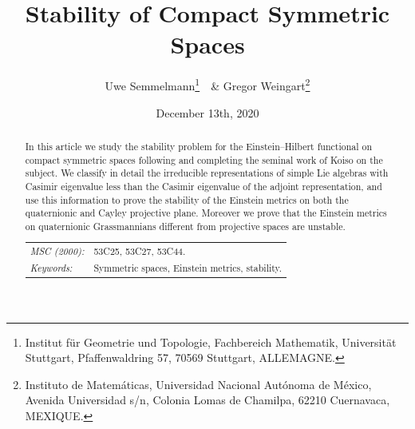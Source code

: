 \documentclass[12pt]{article}
\date{December 13th, 2020}
\title{Stability of Compact Symmetric Spaces}
\author{Uwe Semmelmann\footnote{Institut f\"ur Geometrie und Topologie,
 Fachbereich Mathematik, Universit\"at Stuttgart, Pfaffenwaldring 57,
 70569 Stuttgart, ALLEMAGNE.}\ \ 
 \& Gregor Weingart\footnote{Instituto de Matem\'aticas, Universidad
 Nacional Aut\'onoma de M\'exico, Avenida Universidad s/n, Colonia
 Lomas de Chamilpa, 62210 Cuernavaca, MEXIQUE.}}
\begin{document}
%
\maketitle
%
\begin{abstract}
%
 \noindent
 In this article we study the stability problem for the Einstein--Hilbert
 functional on compact symmetric spaces following and completing the seminal
 work of Koiso on the subject. We classify in detail the irreducible
 representations of simple Lie algebras with Casimir eigenvalue less than
 the Casimir eigenvalue of the adjoint representation, and use this
 information to prove the stability of the Einstein metrics on both
 the quaternionic and Cayley projective plane. Moreover we prove that the
 Einstein metrics on quaternionic Grassmannians different from projective
 spaces are unstable.
 \\[5pt]
 \begin{tabular}{lp{250pt}}
  \textit{MSC (2000):}& 53C25, 53C27, 53C44.
  \\
  \textit{Keywords:}&  Symmetric spaces, Einstein metrics, stability.
 \end{tabular}
%
\end{abstract}
%
\end{document}
